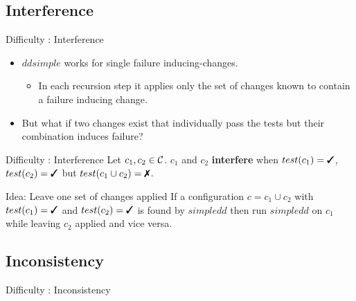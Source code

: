 \subsection{Interference}
\begin{frame}{Difficulty : Interference}
	\begin{itemize}
		\item $ddsimple$ works for single failure inducing-changes.
			\begin{itemize}
				\item In each recursion step it applies only the set of changes known to contain a failure inducing change.
			\end{itemize}
		\item But what if two changes exist that individually pass the tests but their combination induces failure?
	\end{itemize}

	\begin{alertblock}{Difficulty : Interference}
		Let $c_1,c_2 \in \mathcal{C}$. $c_1$ and $c_2$ \textbf{interfere} when $test(c_1)=\cmark$, $test(c_2)=\cmark$ but $test(c_1\cup c_2) = \xmark$.
	\end{alertblock}

	\begin{exampleblock}{Idea: Leave one set of changes applied}
		If a configuration $c = c_1 \cup c_2$ with $test(c_1)=\cmark$ and $test(c_2)=\cmark$ is found by $simpledd$ then run $simpledd$ on $c_1$ while leaving $c_2$ applied and vice versa.
	\end{exampleblock}
\end{frame}

\subsection{Inconsistency}
\begin{frame}{Difficulty : Inconsistency}
	
\end{frame}